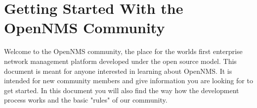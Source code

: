 \section{Getting Started With the OpenNMS Community}
Welcome to the OpenNMS community, the place for the worlds first enterprise network management platform developed under the open source model. This document is meant for anyone interested in learning about OpenNMS. It is intended for new community members and give information you are looking for to get started. In this document you will also find the way how the development process works and the basic "rules" of our community.
